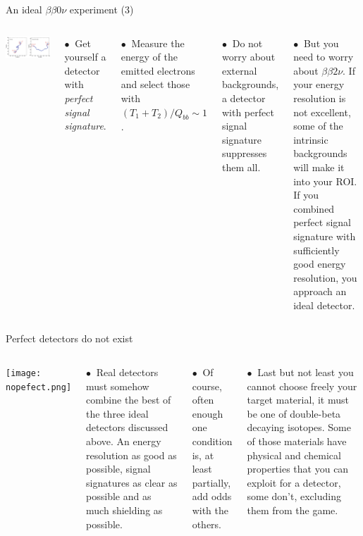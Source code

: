 \documentclass [aspectratio=169]{beamer}
\newcommand{\bbtnu}{\ensuremath{\beta\beta2\nu}}
\begin{document}
\begin{frame}{An ideal ${\beta\beta0\nu}$ experiment (3)}

\begin{columns}
\includegraphics[scale=0.17]{idealtopo.png}


$\bullet~$ Get yourself a detector with {\em perfect signal signature}. 

$\bullet~$ Measure the energy of the emitted electrons and select those with 
$(T_1+T_2)/Q_{bb} \sim 1$.

$\bullet~$ Do not worry about external backgrounds, a detector with perfect signal signature suppresses them all. 

$\bullet~$ But you need to worry about  \bbtnu. If your energy resolution is not excellent, some of the intrinsic backgrounds will make it into your ROI. If you combined perfect signal signature with sufficiently good energy resolution, you approach an ideal detector. 

\end{columns}
\end{frame}

\begin{frame}{Perfect detectors do not exist}
\begin{columns}
\texttt{[image: nopefect.png]}

$\bullet~$ Real detectors must somehow combine the best of the three ideal detectors discussed above. An energy resolution as good as possible, signal signatures as clear as possible  and as much shielding as possible.  

$\bullet~$ Of course, often enough one condition is, at least partially, add odds with the others.

 $\bullet~$ Last but not least you cannot choose freely your target material, it must be one of double-beta decaying isotopes. Some of those materials have physical and chemical properties that you can exploit for a detector, some don't, excluding them from the game. 

\end{columns}
\end{frame}
\end{document}

